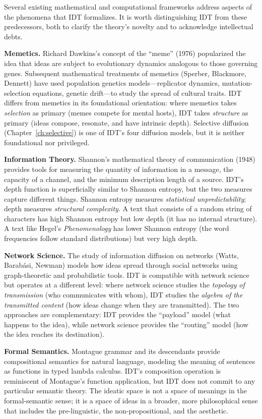 \documentclass[11pt,openany]{book}
\theoremstyle{definition}
\theoremstyle{plain}
\theoremstyle{remark}
\begin{document}
Several existing mathematical and computational frameworks address aspects of the phenomena that IDT formalizes. It is worth distinguishing IDT from these predecessors, both to clarify the theory's novelty and to acknowledge intellectual debts.

\textbf{Memetics.} Richard Dawkins's concept of the ``meme'' (1976) popularized the idea that ideas are subject to evolutionary dynamics analogous to those governing genes. Subsequent mathematical treatments of memetics (Sperber, Blackmore, Dennett) have used population genetics models---replicator dynamics, mutation-selection equations, genetic drift---to study the spread of cultural traits. IDT differs from memetics in its foundational orientation: where memetics takes \emph{selection} as primary (memes compete for mental hosts), IDT takes \emph{structure} as primary (ideas compose, resonate, and have intrinsic depth). Selective diffusion (Chapter~\ref{ch:selective}) is one of IDT's four diffusion models, but it is neither foundational nor privileged.

\textbf{Information Theory.} Shannon's mathematical theory of communication (1948) provides tools for measuring the quantity of information in a message, the capacity of a channel, and the minimum description length of a source. IDT's depth function is superficially similar to Shannon entropy, but the two measures capture different things. Shannon entropy measures \emph{statistical unpredictability}; depth measures \emph{structural complexity}. A text that consists of a random string of characters has high Shannon entropy but low depth (it has no internal structure). A text like Hegel's \emph{Phenomenology} has lower Shannon entropy (the word frequencies follow standard distributions) but very high depth.

\textbf{Network Science.} The study of information diffusion on networks (Watts, Barabási, Newman) models how ideas spread through social networks using graph-theoretic and probabilistic tools. IDT is compatible with network science but operates at a different level: where network science studies the \emph{topology of transmission} (who communicates with whom), IDT studies the \emph{algebra of the transmitted content} (how ideas change when they are transmitted). The two approaches are complementary: IDT provides the ``payload'' model (what happens to the idea), while network science provides the ``routing'' model (how the idea reaches its destination).

\textbf{Formal Semantics.} Montague grammar and its descendants provide compositional semantics for natural language, modeling the meaning of sentences as functions in typed lambda calculus. IDT's composition operation is reminiscent of Montague's function application, but IDT does not commit to any particular semantic theory. The ideatic space is not a space of meanings in the formal-semantic sense; it is a space of ideas in a broader, more philosophical sense that includes the pre-linguistic, the non-propositional, and the aesthetic.
\end{document}
